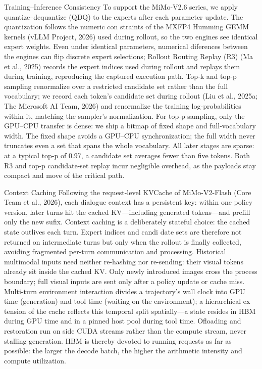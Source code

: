 \documentclass[
  10
]{article}
\begin{document}
Training--Inference Consistency To support the MiMo-V2.6 series, we
apply quantize--dequantize (QDQ) to the experts after each parameter
update. The quantization follows the numeric con straints of the MXFP4
Humming GEMM kernels (vLLM Project, 2026) used during rollout, so the
two engines see identical expert weights. Even under identical
parameters, numerical diferences between the engines can flip discrete
expert selections; Rollout Routing Replay (R3) (Ma et al., 2025) records
the expert indices used during rollout and replays them during training,
reproducing the captured execution path. Top-k and top-p sampling
renormalize over a restricted candidate set rather than the full
vocabulary; we record each token's candidate set during rollout (Liu et
al., 2025a; The Microsoft AI Team, 2026) and renormalize the training
log-probabilities within it, matching the sampler's normalization. For
top-p sampling, only the GPU--CPU transfer is dense: we ship a bitmap of
fixed shape and full-vocabulary width. The fixed shape avoids a GPU--CPU
synchronization; the full width never truncates even a set that spans
the whole vocabulary. All later stages are sparse: at a typical top-p of
0.97, a candidate set averages fewer than five tokens. Both R3 and top-p
candidate-set replay incur negligible overhead, as the payloads stay
compact and move of the critical path.

Context Caching Following the request-level KVCache of MiMo-V2-Flash
(Core Team et al., 2026), each dialogue context has a persistent key:
within one policy version, later turns hit the cached KV---including
generated tokens---and prefill only the new sufix. Context caching is a
deliberately stateful choice: the cached state outlives each turn.
Expert indices and candi date sets are therefore not returned on
intermediate turns but only when the rollout is finally collected,
avoiding fragmented per-turn communication and processing. Historical
multimodal inputs need neither re-hashing nor re-sending: their visual
tokens already sit inside the cached KV. Only newly introduced images
cross the process boundary; full visual inputs are sent only after a
policy update or cache miss. Multi-turn environment interaction divides
a trajectory's wall clock into GPU time (generation) and tool time
(waiting on the environment); a hierarchical ex tension of the cache
reflects this temporal split spatially---a state resides in HBM during
GPU time and in a pinned host pool during tool time. Ofloading and
restoration run on side CUDA streams rather than the compute stream,
never stalling generation. HBM is thereby devoted to running requests as
far as possible: the larger the decode batch, the higher the arithmetic
intensity and compute utilization.
\end{document}
